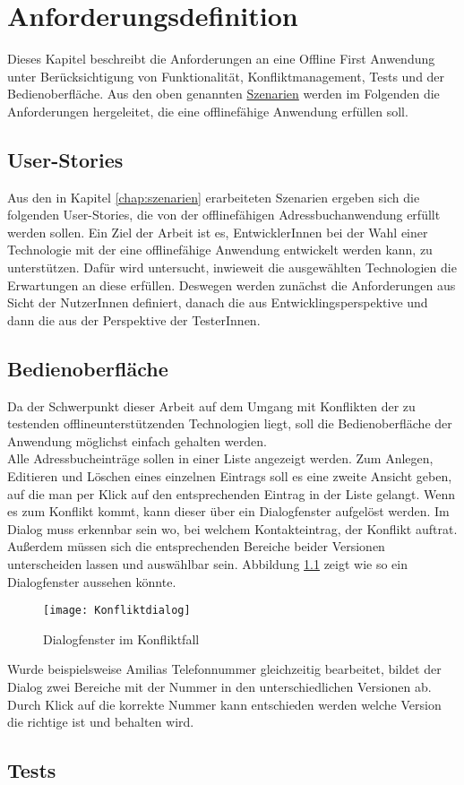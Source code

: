 \chapter{\label{chap:anforderungen}Anforderungsdefinition}
Dieses Kapitel beschreibt die Anforderungen an eine Offline First Anwendung unter Berücksichtigung von Funktionalität, Konfliktmanagement, Tests und der Bedienoberfläche.
Aus den oben genannten \hyperref[chap:szenarien]{Szenarien} werden im Folgenden die Anforderungen hergeleitet, die eine offlinefähige Anwendung erfüllen soll.
%
%

%
%
\section{User-Stories}
Aus den in Kapitel \ref{chap:szenarien} erarbeiteten Szenarien ergeben sich die folgenden User-Stories, die von der offlinefähigen Adressbuchanwendung erfüllt werden sollen.
Ein Ziel der Arbeit ist es, EntwicklerInnen bei der Wahl einer Technologie mit der eine offlinefähige Anwendung entwickelt werden kann, zu unterstützen. Dafür wird untersucht, inwieweit die ausgewählten Technologien die Erwartungen an diese erfüllen.
Deswegen werden zunächst die Anforderungen aus Sicht der NutzerInnen definiert, danach die aus Entwicklingsperspektive und dann die aus der Perspektive der TesterInnen.



%
%

%
%
\section{Bedienoberfläche}
Da der Schwerpunkt dieser Arbeit auf dem Umgang mit Konflikten der zu testenden offlineunterstützenden Technologien liegt, soll die Bedienoberfläche der Anwendung möglichst einfach gehalten werden.\\
Alle Adressbucheinträge sollen in einer Liste angezeigt werden. Zum Anlegen, Editieren und Löschen eines einzelnen Eintrags soll es eine zweite Ansicht geben, auf die man per Klick auf den entsprechenden Eintrag in der Liste gelangt.
Wenn es zum Konflikt kommt, kann dieser über ein Dialogfenster aufgelöst werden. Im Dialog muss erkennbar sein wo, bei welchem Kontakteintrag, der Konflikt auftrat.
Außerdem müssen sich die entsprechenden Bereiche beider Versionen unterscheiden lassen und auswählbar sein. Abbildung \ref{fig:dialog} zeigt wie so ein Dialogfenster aussehen könnte.
\begin{figure}[H]
	\centering
	\texttt{[image: Konfliktdialog]}
	\grayRule
	\caption{Dialogfenster im Konfliktfall}
	\label{fig:dialog}
\end{figure}
Wurde beispielsweise Amilias Telefonnummer gleichzeitig bearbeitet, bildet der Dialog zwei Bereiche mit der Nummer in den unterschiedlichen Versionen ab.
Durch Klick auf die korrekte Nummer kann entschieden werden welche Version die richtige ist und behalten wird.
%
%
\section{Tests}